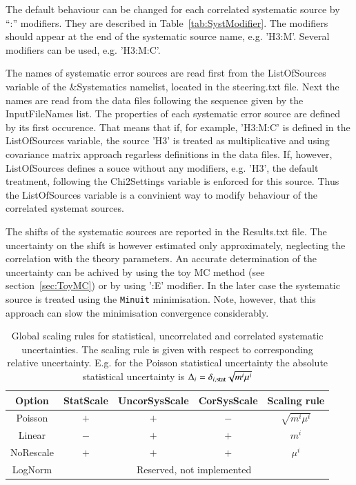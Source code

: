 The default behaviour can be changed for each correlated systematic source by ``:'' modifiers.
They are described in Table~\ref{tab:SystModifier}. The modifiers should appear at the end 
of the systematic source name, e.g. {\sc 'H3:M'}. Several modifiers can be used, e.g. {\sc 'H3:M:C'}.

The names of systematic error sources are read first from the {\sc ListOfSources} variable of the 
{\sc \&Systematics} namelist, located in the {\sc steering.txt} file. Next the names are read from the
data files following the sequence given by the {\sc InputFileNames} list. The properties of each systematic
error source are defined by its first occurence. That means that if, for example, {\sc 'H3:M:C'} is defined
in the {\sc ListOfSources} variable, the source {\sc 'H3'} is treated as multiplicative and using covariance
matrix approach regarless definitions in the data files. If, however, {\sc ListOfSources} defines a souce
without any modifiers, e.g. {\sc 'H3'}, the default treatment, following the {\sc Chi2Settings} variable is
enforced for this source.
Thus the {\sc ListOfSources } variable is a convinient way to modify behaviour of the correlated systemat
sources.

The shifts of the systematic sources are reported in the {\sc Results.txt} file. The uncertainty on the shift
is however estimated only approximately, neglecting the correlation with the theory parameters. An accurate determination
of the uncertainty can be achived by using the toy MC method (see section~\ref{sec:ToyMC}) or by using {\sc ':E'} 
modifier. In the later case the systematic source is treated using the {\tt Minuit} minimisation. Note, however,
that this approach can slow the minimisation convergence considerably.
\begin{table}
\begin{center}
\begin{tabular}{ccccc} 
\hline
 Option  & {\sc StatScale} & {\sc UncorSysScale} & {\sc CorSysScale} & Scaling rule \\
\hline
  {\sc Poisson}   &  $+$  &  $+$  &  $-$  & $\sqrt{ m^i \mu^i}$ \\
  {\sc Linear}    & $-$   &  $+$  &  $+$  & $m^i$               \\
  {\sc NoRescale} & $+$   &  $+$  &  $+$  & $\mu^i$   \\
  {\sc LogNorm}   &  \multicolumn{4}{c}{Reserved, not implemented} \\
\hline
\end{tabular}
\end{center}
\caption{\label{tab:ErrScale}Global scaling rules for statistical, 
uncorrelated and correlated systematic uncertainties. The scaling
rule is given with respect to corresponding relative uncertainty.
E.g. for the {\sc Poisson} statistical uncertainty the absolute statistical
uncertainty is $\Delta_i = \delta_{i, {\rm stat}}\sqrt{m^i\mu^i}$   }
\end{table}

